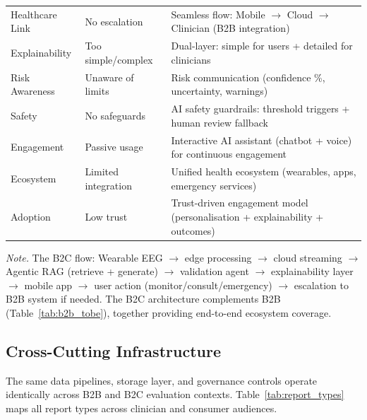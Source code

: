 {\begin{xltabular}{\textwidth}{@{} >{\raggedright\arraybackslash}p{3.0cm} >{\raggedright\arraybackslash}p{3.2cm} L @{}}
\addlinespace
Healthcare Link & No escalation & Seamless flow: Mobile $\to$ Cloud $\to$ Clinician (B2B integration) \\
\addlinespace
Explainability & Too simple/complex & Dual-layer: simple for users + detailed for clinicians \\
\addlinespace
Risk Awareness & Unaware of limits & Risk communication (confidence \%, uncertainty, warnings) \\
\addlinespace
Safety & No safeguards & AI safety guardrails: threshold triggers + human review fallback \\
\addlinespace
Engagement & Passive usage & Interactive AI assistant (chatbot + voice) for continuous engagement \\
\addlinespace
Ecosystem & Limited integration & Unified health ecosystem (wearables, apps, emergency services) \\
\addlinespace
Adoption & Low trust & Trust-driven engagement model (personalisation + explainability + outcomes) \\
\end{xltabular}}
\vspace{0.5em}
\noindent\textit{Note.} The B2C flow: Wearable EEG $\to$ edge processing $\to$ cloud streaming $\to$ Agentic RAG (retrieve + generate) $\to$ validation agent $\to$ explainability layer $\to$ mobile app $\to$ user action (monitor/consult/emergency) $\to$ escalation to B2B system if needed. The B2C architecture complements B2B (Table~\ref{tab:b2b_tobe}), together providing end-to-end ecosystem coverage.
\fi %

\label{sec:b2c_tobe}
\label{tab:b2c_tobe}

\subsection{Cross-Cutting Infrastructure}
\label{sec:cross_cutting_infrastructure}
\label{sec:report_generation}

\iffalse %
The same data pipelines, storage layer, and governance controls operate identically across B2B and B2C evaluation contexts. Table~\ref{tab:report_types} maps all report types across clinician and consumer audiences.


